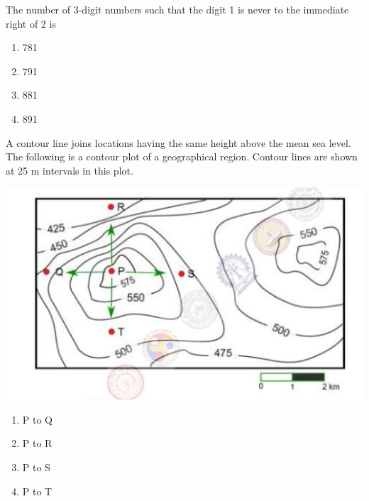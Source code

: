 \item The number of 3-digit numbers such that the digit 1 is never to the immediate right of 2 is 
\begin{enumerate}
\item 781
\item 791
\item 881
\item 891
\end{enumerate}

\item A contour line joins locations having the same height above the mean sea level. The following is a contour plot of a geographical region. Contour lines are shown at 25 m intervals in this plot.

\includegraphics[scale=0.4]{65}

\begin{enumerate}
\item P to Q
\item P to R
\item P to S
\item P to T
\end{enumerate}